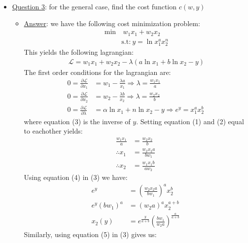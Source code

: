\documentclass{article}
\begin{document}
  \begin{itemize}
    \item  \underline{Question 3}: for the general case, find the cost function $c(w,y)$
    \begin{itemize}
      \item  \underline{Answer}: we have the following cost minimization problem:
      \begin{align*}
        \min &\ w_{1}x_{1} + w_{2}x_{2} \\
        &\text{s.t:} \ y = \ln x_{1}^{a}x_{2}^{n}
      \end{align*}
      This yields the following lagrangian:
      \begin{gather*}
        \mathcal{L} = w_{1}x_{1} + w_{2}x_{2} - \lambda (a \ln x_{1} + b \ln x_{2} - y)
      \end{gather*}
      The first order conditions for the lagrangian are:
      \begin{align*}
        0 = \frac{\partial \mathcal{L}}{ \partial x_{1}} &= w_{1} - \frac{\lambda a}{x_{1}} \Rightarrow \lambda = \frac{w_{1}x_{1}}{a} \ \tag{1} \\
        0 = \frac{\partial \mathcal{L}}{ \partial x_{2}} &= w_{2} - \frac{\lambda b}{x_{2}} \Rightarrow \lambda = \frac{w_{2}x_{2}}{b} \ \tag{2} \\
        0 = \frac{\partial \mathcal{L}}{ \partial \lambda} &= \alpha \ln x_{1} + n \ln x_{2} - y \Rightarrow e^{y} = x_{1}^{a}x_{2}^{b} \ \tag{3}
      \end{align*}
      where equation (3) is the inverse of $y$. Setting equation (1) and (2) equal to eachother yields:
      \begin{align*}
        \frac{w_{1}x_{1}}{a} &= \frac{w_{2}x_{2}}{b} \\
        \therefore x_{1} &= \frac{w_{2}x_{2}a}{bw_{1}} \ \tag{4} \\
        \therefore x_{2} &= \frac{w_{1}x_{1}b}{aw_{2}} \ \tag{5}
      \end{align*}
      Using equation (4) in (3) we have:
      \begin{align*}
        e^{y} &= (\frac{w_{2}x_{2}a}{bw_{1}})^{a} x_{2}^{b} \\
        e^{y}(bw_{1})^{a} &= (w_{2}a)^{a}x_{2}^{a+b} \\
        x_{2}(y) &= e^{\tfrac{y}{a + b}} (\frac{bw_{1}}{w_{2}a})^{\tfrac{a}{a+b}} \ \tag{*}
      \end{align*}
      Similarly, using equation (5) in (3) gives us:
      \begin{gather*}

\end{gather*}
\end{itemize}
\end{itemize}
\end{document}
